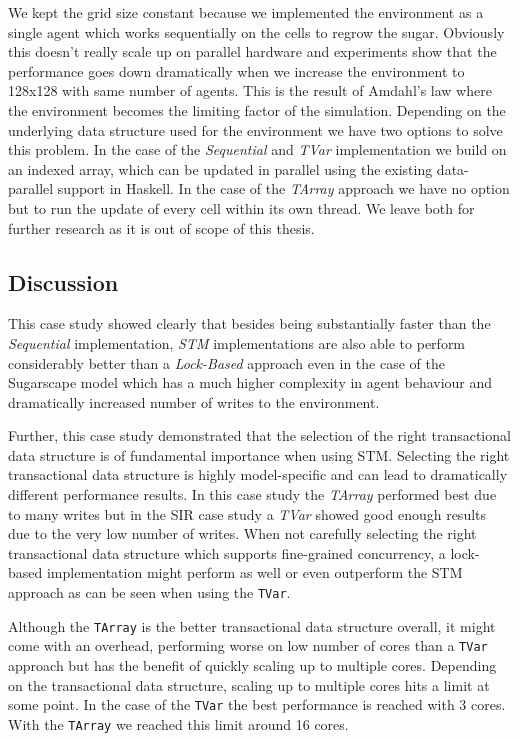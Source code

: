We kept the grid size constant because we implemented the environment as a single agent which works sequentially on the cells to regrow the sugar. Obviously this doesn't really scale up on parallel hardware and experiments show that the performance goes down dramatically when we increase the environment to 128x128 with same number of agents. This is the result of Amdahl's law where the environment becomes the limiting factor of the simulation. Depending on the underlying data structure used for the environment we have two options to solve this problem. In the case of the \textit{Sequential} and \textit{TVar} implementation we build on an indexed array, which can be updated in parallel using the existing data-parallel support in Haskell. In the case of the \textit{TArray} approach we have no option but to run the update of every cell within its own thread. We leave both for further research as it is out of scope of this thesis.

\subsection{Discussion}
This case study showed clearly that besides being substantially faster than the \textit{Sequential} implementation, \textit{STM} implementations are also able to perform considerably better than a \textit{Lock-Based} approach even in the case of the Sugarscape model which has a much higher complexity in agent behaviour and dramatically increased number of writes to the environment.

Further, this case study demonstrated that the selection of the right transactional data structure is of fundamental importance when using STM. Selecting the right transactional data structure is highly model-specific and can lead to dramatically different performance results. In this case study the \textit{TArray} performed best due to many writes but in the SIR case study a \textit{TVar} showed good enough results due to the very low number of writes. When not carefully selecting the right transactional data structure which supports fine-grained concurrency, a lock-based implementation might perform as well or even outperform the STM approach as can be seen when using the \texttt{TVar}.

Although the \texttt{TArray} is the better transactional data structure overall, it might come with an overhead, performing worse on low number of cores than a \texttt{TVar} approach but has the benefit of quickly scaling up to multiple cores. Depending on the transactional data structure, scaling up to multiple cores hits a limit at some point. In the case of the \texttt{TVar} the best performance is reached with 3 cores. With the \texttt{TArray} we reached this limit around 16 cores.

